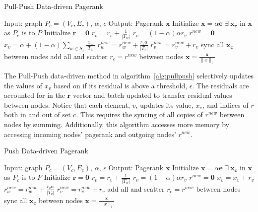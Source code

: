 \documentclass[letterpaper,11pt,onecolumn]{article}
\begin{document}
\begin{algorithm}
\caption{Pull-Push Data-driven Pagerank}
\label{alg:pullpush}
\begin{algorithmic}[1]
  \STATE Input: graph $P_{c} = (V_c, E_c)$, $\alpha$, $\epsilon$
  \STATE Output: Pagerank $\mathbf{x}$
  \STATE Initialize $\mathbf{x} = \alpha \mathbf{e}$
  \STATE $\exists  \medspace \mathbf{x_c}$ in $\mathbf{x}$ as $P_c$ is to $P$
  \STATE Initialize $\mathbf{r} = \mathbf{0}$
		\STATE $r_v = r_v + \frac{1}{|T_w|}$
	\ENDFOR
	\STATE $r_v = (1 - \alpha)\alpha r_v$
  \ENDFOR
	\STATE $r^{new} = \mathbf{0}$
			\STATE $x_{v} = \alpha + (1 - \alpha) \sum_{w \in S_v} \frac{x_{w}}{|T_w|} $
				\STATE $r_w^{new} = r_w^{new} + \frac{r_v \alpha}{|T_v|}$
			\ENDFOR
		\ELSE
			\STATE $r_v^{new} = r_v^{new} + r_v$
		\ENDIF
	\ENDFOR
	\STATE sync all $\mathbf{x_c}$ between nodes
	\STATE add all and scatter $ r_c = r^{new}$ between nodes
  \ENDWHILE
  \STATE $\mathbf{x} = \frac{\mathbf{x} }{\|x\|_{1}}$
\end{algorithmic}
\end{algorithm}

The Pull-Push data-driven method in algorithm~\ref{alg:pullpush} selectively updates the values of $x_v$ based on if its residual is above a threshold, $\epsilon$. The residuals are accounted for in the $\mathbf{r}$ vector and batch updated to transfer residual values between nodes. Notice that each element, $v$, updates its value, $x_v$, and indices of $r$ both in and out of set $c$. This requires the syncing of all copies of $r^{new}$ between nodes by summing. Additionally, this algorithm accesses more memory by accessing incoming nodes' pagerank and outgoing nodes' $r^{new}$.

\begin{algorithm}
\caption{Push Data-driven Pagerank}
\label{alg:push}
\begin{algorithmic}[1]
  \STATE Input: graph $P_{c} = (V_c, E_c)$, $\alpha$, $\epsilon$
  \STATE Output: Pagerank $\mathbf{x}$
  \STATE Initialize $\mathbf{x} = \alpha \mathbf{e}$
  \STATE $\exists  \medspace \mathbf{x_c}$ in $\mathbf{x}$ as $P_c$ is to $P$
  \STATE Initialize $\mathbf{r} = \mathbf{0}$
		\STATE $r_v = r_v + \frac{1}{|T_w|}$
	\ENDFOR
	\STATE $r_v = (1 - \alpha)\alpha r_v$
  \ENDFOR
	\STATE $r^{new} = \mathbf{0}$
			\STATE $x_{v} = x_{v} + r_v $
				\STATE $r_w^{new} = r_w^{new} + \frac{r_v \alpha}{|T_v|}$
			\ENDFOR
		\ELSE
			\STATE $r_v^{new} = r_v^{new} + r_v$
		\ENDIF
	\ENDFOR
	\STATE add all and scatter $ r_c = r^{new}$ between nodes
  \ENDWHILE
\STATE sync all $\mathbf{x_c}$ between nodes
  \STATE $\mathbf{x} = \frac{\mathbf{x} }{\|x\|_{1}}$
\end{algorithmic}
\end{algorithm}
\end{document}
